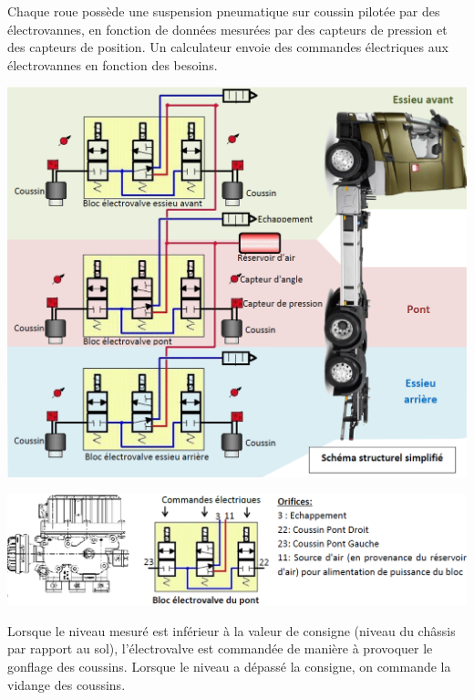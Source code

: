 \documentclass[10pt,fleqn]{article} %
\begin{document}
\begin{multicols}{2}
Chaque roue possède une suspension pneumatique sur coussin pilotée par des électrovannes, en fonction de données mesurées par des capteurs de pression et des capteurs de position. Un calculateur envoie des commandes électriques aux électrovannes en fonction des besoins.

\begin{center}
\includegraphics[width=\linewidth]{images/fig_07}
\end{center}


\begin{center}
\includegraphics[width=\linewidth]{images/fig_08}
\end{center}

Lorsque le niveau mesuré est inférieur à la valeur de consigne (niveau du châssis par rapport au sol), l’électrovalve est commandée de manière à provoquer le gonflage des coussins.
Lorsque le niveau a dépassé la consigne, on commande la vidange des coussins.


\end{multicols}
\end{document}
